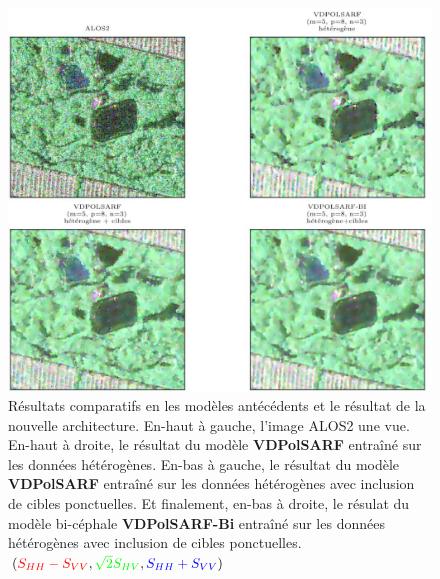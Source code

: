  \begin{figure}
  \includegraphics[width=1.0\linewidth]{figures/Conclusion/bi-vspolsar.jpg}
  \centering
  \caption{
  \small{Résultats comparatifs en les modèles antécédents et le résultat de la nouvelle architecture.  En-haut à gauche, l'image ALOS2 une vue. En-haut à droite, le résultat du modèle \textbf{VDPolSARF} entraîné sur les données hétérogènes. En-bas à gauche, le résultat du modèle \textbf{VDPolSARF} entraîné sur les données hétérogènes avec inclusion de cibles ponctuelles.  Et finalement, en-bas à droite, le résulat du modèle bi-céphale \textbf{VDPolSARF-Bi} entraîné sur les données hétérogènes avec inclusion de cibles ponctuelles. $(\textcolor{red}{S_{HH}-S_{VV}}, \textcolor{green}{\sqrt{2}S_{HV}}, \textcolor{blue}{S_{HH}+S_{VV}})$ }
  }
  \label{fig:res-bi-vdpolsar}
\end{figure}
